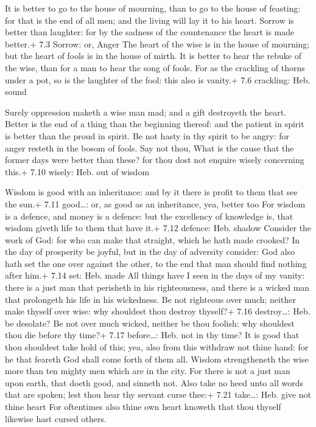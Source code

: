  It is better to go to the house of mourning, than to go
to the house of feasting: for that is the end of all men; and the living
will lay it to his heart.  Sorrow is better than laughter:
for by the sadness of the countenance the heart is made better.+ 7.3
Sorrow: or, Anger  The heart of the wise is in the house of
mourning; but the heart of fools is in the house of mirth. 
It is better to hear the rebuke of the wise, than for a man to hear the
song of fools.  For as the crackling of thorns under a pot,
so is the laughter of the fool: this also is vanity.+ 7.6 crackling:
Heb. sound

 Surely oppression maketh a wise man mad; and a gift
destroyeth the heart.  Better is the end of a thing than the
beginning thereof: and the patient in spirit is better than the proud in
spirit.  Be not hasty in thy spirit to be angry: for anger
resteth in the bosom of fools.  Say not thou, What is the
cause that the former days were better than these? for thou dost not
enquire wisely concerning this.+ 7.10 wisely: Heb. out of wisdom

 Wisdom is good with an inheritance: and by it there is
profit to them that see the sun.+ 7.11 good\ldots: or, as good as an
inheritance, yea, better too  For wisdom is a defence, and
money is a defence: but the excellency of knowledge is, that wisdom
giveth life to them that have it.+ 7.12 defence: Heb. shadow
 Consider the work of God: for who can make that straight,
which he hath made crooked?  In the day of prosperity be
joyful, but in the day of adversity consider: God also hath set the one
over against the other, to the end that man should find nothing after
him.+ 7.14 set: Heb. made  All things have I seen in the
days of my vanity: there is a just man that perisheth in his
righteousness, and there is a wicked man that prolongeth his life in his
wickedness.  Be not righteous over much; neither make
thyself over wise: why shouldest thou destroy thyself?+ 7.16
destroy\ldots: Heb. be desolate?  Be not over much wicked,
neither be thou foolish: why shouldest thou die before thy time?+ 7.17
before\ldots: Heb. not in thy time?  It is good that thou
shouldest take hold of this; yea, also from this withdraw not thine
hand: for he that feareth God shall come forth of them all.
 Wisdom strengtheneth the wise more than ten mighty men
which are in the city.  For there is not a just man upon
earth, that doeth good, and sinneth not.  Also take no heed
unto all words that are spoken; lest thou hear thy servant curse thee:+
7.21 take\ldots: Heb. give not thine heart  For oftentimes
also thine own heart knoweth that thou thyself likewise hast cursed
others.

